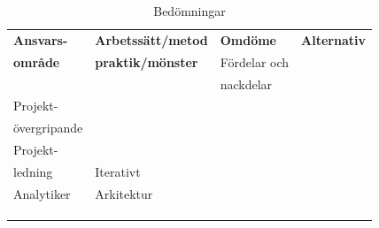 \documentclass[conference]{IEEEtran}
\begin{document}
\begin{table}[htbp]
\caption{Bedömningar}
\begin{center}
\begin{tabular}{|l|l|l|l|}
\hline
\textbf{Ansvars-}   & \textbf{Arbetssätt/metod}     & \textbf{Omdöme}       & \textbf{Alternativ} \\
\textbf{område}     & \textbf{praktik/mönster}      & Fördelar och          & \\
                    &                               & nackdelar             &  \\
\hline
Projekt-            &                               &                       & \\
övergripande        &                               &                       & \\
\hline
Projekt-            &                               &                       & \\
ledning             & Iterativt                     & \cellcolor{green}     & \\
\hline
Analytiker          & Arkitektur                    &                       & \\
\hline
                    &                               & \cellcolor{pink}      & \\
\hline
                    &                               & \cellcolor{yellow}    & \\
\hline
                    &                               &                       & \\
\hline
\end{tabular}
\label{tab1}
\end{center}
\end{table}
\end{document}
